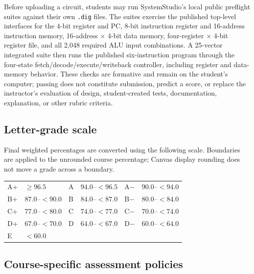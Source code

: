 \documentclass[10pt,letterpaper]{article}
\begin{document}
Before uploading a circuit, students may run SystemStudio's local public preflight suites against their own \texttt{.dig} files. The suites exercise the published top-level interfaces for the 4-bit register and PC, 8-bit instruction register and 16-address instruction memory, 16-address $\times$ 4-bit data memory, four-register $\times$ 4-bit register file, and all 2,048 required ALU input combinations. A 25-vector integrated suite then runs the published six-instruction program through the four-state fetch/decode/execute/writeback controller, including register and data-memory behavior. These checks are formative and remain on the student's computer; passing does not constitute submission, predict a score, or replace the instructor's evaluation of design, student-created tests, documentation, explanation, or other rubric criteria.

\subsection{Letter-grade scale}

Final weighted percentages are converted using the following scale. Boundaries are applied to the unrounded course percentage; Canvas display rounding does not move a grade across a boundary.

\begin{center}
\begin{tabular}{llllll}
\toprule
A+ & $\geq 96.5$ & A & $94.0$--$<96.5$ & A$-$ & $90.0$--$<94.0$\\
B+ & $87.0$--$<90.0$ & B & $84.0$--$<87.0$ & B$-$ & $80.0$--$<84.0$\\
C+ & $77.0$--$<80.0$ & C & $74.0$--$<77.0$ & C$-$ & $70.0$--$<74.0$\\
D+ & $67.0$--$<70.0$ & D & $64.0$--$<67.0$ & D$-$ & $60.0$--$<64.0$\\
E & $<60.0$ & & & &\\
\bottomrule
\end{tabular}
\end{center}

\subsection{Course-specific assessment policies}
\end{document}
